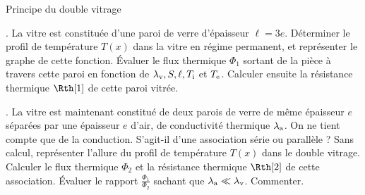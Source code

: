 \begin{exo}[PC][1][TD]{Principe du double vitrage}
\begin{quest}
\item {}. La vitre est constituée d'une paroi de verre  d'épaisseur $\ell=3e$. Déterminer le profil de température $T(x)$ dans la vitre en régime permanent, et représenter le graphe de cette fonction.
 Évaluer le flux thermique $\Phi_{1}$ sortant de la pièce à travers cette paroi en fonction de $\lambda_{\rm v},S,\ell,T_{\rm{i}}$ et $T_{\rm{e}}$. Calculer ensuite la résistance thermique $\Rth[1]$ de cette paroi vitrée.




\item {}. La vitre est maintenant constitué de deux parois de verre de même épaisseur $e$ séparées par une épaisseur $e$ d'air, de conductivité thermique $\lambda_{\rm{a}}$.
On ne tient compte que de la conduction.  S’agit-il d’une association série ou parallèle ? Sans calcul, représenter l’allure du profil de température $T(x)$ dans le double vitrage. Calculer le flux thermique $\Phi _2$ et la résistance thermique $\Rth[2]$ de cette association.
Évaluer le rapport $\frac{\Phi_1}{\Phi_2}$ sachant que $\lambda_{\rm a} \ll \lambda_{\rm v}$. Commenter.

\end{quest}
\end{exo}
